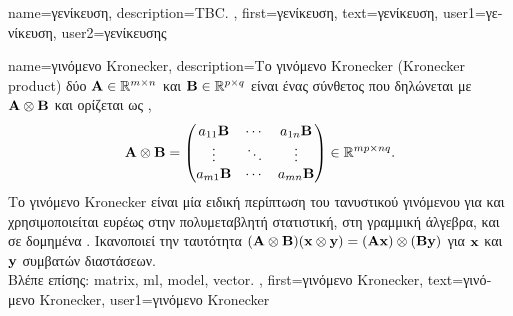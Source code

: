 {name={\foreignlanguage{greek}{γενίκευση}}, 
	description={TBC. },
	first={\foreignlanguage{greek}{γενίκευση}},
	text={\foreignlanguage{greek}{γενίκευση}},
	user1={\foreignlanguage{greek}{γενίκευση}}, %
  	user2={\foreignlanguage{greek}{γενίκευσης}} %
}

{name={\foreignlanguage{greek}{γινόμενο} Kronecker}, 
	description={\foreignlanguage{greek}{Το γινόμενο} Kronecker 
		(Kronecker product) \foreignlanguage{greek}{δύο}  ${\bf A} \in \mathbb{R}^{m \times n}$ 
		\foreignlanguage{greek}{και ${\bf B} \in \mathbb{R}^{p \times q}$ είναι ένας σύνθετος}  
		\foreignlanguage{greek}{που δηλώνεται με ${\bf A} \otimes {\bf B}$ και ορίζεται ως} \cite{GolubVanLoanBook}, \cite{HornMatAnalysis}
    		\[
      		{\bf A} \otimes {\bf B} =
      		\begin{pmatrix}
        		a_{11}{\bf B} & \cdots & a_{1n}{\bf B} \\
        		\vdots & \ddots & \vdots \\
        		a_{m1}{\bf B} & \cdots & a_{mn}{\bf B}
      		\end{pmatrix}
      		\in \mathbb{R}^{mp \times nq}.
    		\]
    		\foreignlanguage{greek}{Το γινόμενο} Kronecker \foreignlanguage{greek}{είναι μία ειδική περίπτωση του τανυστικού 
		γινόμενου για}  \foreignlanguage{greek}{και χρησιμοποιείται ευρέως στην πολυμεταβλητή 
		στατιστική, στη γραμμική άλγεβρα, και σε δομημένα}  . 
		\foreignlanguage{greek}{Ικανοποιεί την ταυτότητα $({\bf A} \otimes {\bf B})({\bf x} \otimes {\bf y}) = ({\bf A}{\bf x}) \otimes ({\bf B}{\bf y})$ 
		για}  ${\bf x}$ \foreignlanguage{greek}{και ${\bf y}$ συμβατών διαστάσεων}. 
		\\
		\foreignlanguage{greek}{Βλέπε επίσης:} \gls{matrix}, \gls{ml}, \gls{model}, \gls{vector}. },
	first={\foreignlanguage{greek}{γινόμενο} Kronecker},
	text={\foreignlanguage{greek}{γινόμενο} Kronecker},
	user1={\foreignlanguage{greek}{γινόμενο} Kronecker} %
}

